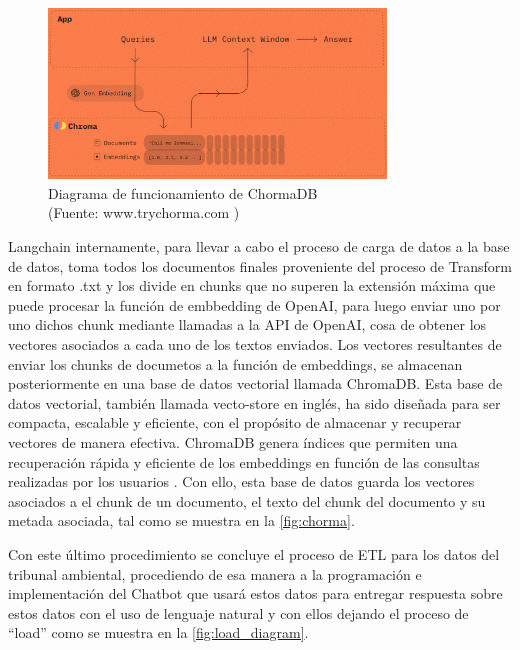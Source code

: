 \begin{figure}[ht!]
    \centering
    \includegraphics[width=0.8\textwidth]{figures/chorma.png}
    \caption[Diagrama de funcionamiento de ChormaDB]{Diagrama de funcionamiento de ChormaDB\\
    {\scriptsize (Fuente: www.trychorma.com \cite{trychromaAInativeOpensource})}}
    \label{fig:chorma}
\end{figure}

\newpage

\par Langchain internamente, para llevar a cabo el proceso de carga de datos a la base de datos, toma todos los documentos finales proveniente del proceso de Transform en formato .txt y los divide en chunks que no superen la extensión máxima que puede procesar la función de embbedding de OpenAI, para luego enviar uno por uno dichos chunk mediante llamadas a la API de OpenAI, cosa de obtener los vectores asociados a cada uno de los textos enviados. 
Los vectores resultantes de enviar los chunks de documetos a la función de embeddings, se almacenan posteriormente en una base de datos vectorial llamada ChromaDB. Esta base de 
datos vectorial, también llamada vecto-store en inglés, ha sido diseñada para ser compacta, escalable y eficiente, con el propósito de almacenar y recuperar vectores de manera 
efectiva. ChromaDB genera índices que permiten una recuperación rápida y eficiente de los embeddings en función de las 
consultas realizadas por los usuarios \cite{langchain1}. Con ello, esta base de datos guarda los vectores asociados a el chunk de un documento, 
el texto del chunk del documento y su metada asociada, tal como se muestra en la \autoref{fig:chorma}.


\par Con este último procedimiento se concluye el proceso de ETL para los datos del tribunal ambiental, procediendo de esa manera 
a la programación e implementación del Chatbot que usará estos datos para entregar respuesta sobre estos datos con el uso de 
lenguaje natural y con ellos dejando el proceso de ``load'' como se muestra en la \autoref{fig:load_diagram}.\\


